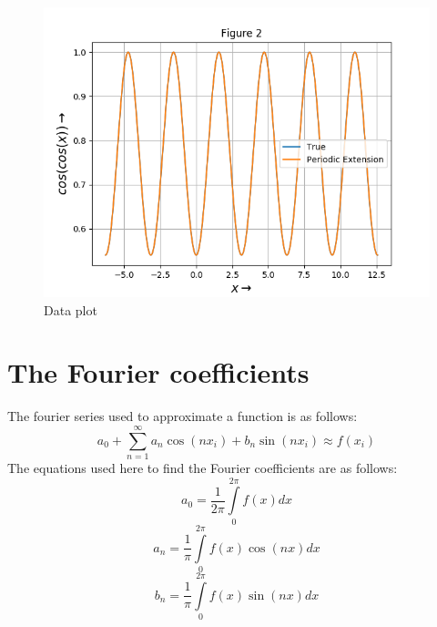 \documentclass[11pt, a4paper]{article}
\begin{document}
   \begin{figure}[!tbh]
   	\centering
   	\includegraphics[scale=0.6]{Figure_2p.png}   
   	\caption{Data plot}
   	\label{fig:sample}
   \end{figure} 

\section{The Fourier coefficients}
The fourier series used to approximate a function is as follows:
\begin{equation}
    a_{0} + \sum\limits_{n=1}^{\infty} {{a_{n}\cos(nx_{i})+b_{n}\sin(nx_{i})}} \approx f(x_{i}) 
    \end{equation}
    	The equations used here to find the Fourier coefficients are as follows:
    \begin{equation}
         a_{0} = \frac{1}{2\pi}\int\limits_{0}^{2\pi} f(x)dx 
    \end{equation}
    \begin{equation}
         a_{n} = \frac{1}{\pi}\int\limits_{0}^{2\pi} f(x)\cos(nx)dx 
    \end{equation}
    \begin{equation}
         b_{n} = \frac{1}{\pi}\int\limits_{0}^{2\pi} f(x)\sin(nx)dx 
    \end{equation}
\end{document}
